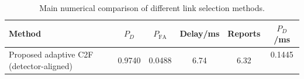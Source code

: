 \begin{table}[t]
    \centering
    \caption{Main numerical comparison of different link selection methods.}
    \label{tab:main_summary}
    \begin{tabular}{l c c c c c}
        \hline
        Method & $P_D$ & $P_{\mathrm{FA}}$ & Delay/ms & Reports & $P_D$/ms \\
        \hline
        Proposed adaptive C2F (detector-aligned) & 0.9740 & 0.0488 & 6.74 & 6.32 & 0.1445 \
        \hline
    \end{tabular}
\end{table}
